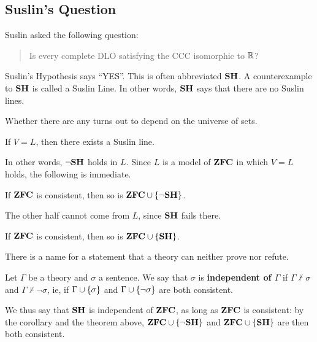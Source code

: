 \subsection{Suslin's Question}

Suslin asked the following question:
\begin{quote}
    Is every complete DLO satisfying the CCC isomorphic to $\mathbb{R}$?
\end{quote}
Suslin's Hypothesis says ``YES''. This is often abbreviated $\mathbf{SH}$. A counterexample to $\mathbf{SH}$ is called a Suslin Line. In other words, $\mathbf{SH}$ says that there are no Suslin lines.

Whether there are any turns out to depend on the universe of sets.

\begin{boxtheorem}[Jensen, 1960s]
    If $V = L$, then there exists a Suslin line.
\end{boxtheorem}

In other words, $\neg\mathbf{SH}$ holds in $L$. Since $L$ is a model of $\mathbf{ZFC}$ in which $V = L$ holds, the following is immediate.

\begin{boxcorollary}
    If $\mathbf{ZFC}$ is consistent, then so is $\mathbf{ZFC} \cup \left\{ \neg\mathbf{SH} \right\}$.
\end{boxcorollary}

The other half cannot come from $L$, since $\mathbf{SH}$ fails there.

\begin{boxtheorem}
    If $\mathbf{ZFC}$ is consistent, then so is $\mathbf{ZFC} \cup \left\{ \mathbf{SH} \right\}$.
\end{boxtheorem}

There is a name for a statement that a theory can neither prove nor refute.

\begin{boxdefinition}[Independence]
    Let $\Gamma$ be a theory and $\sigma$ a sentence. We say that $\sigma$ is \textbf{independent of $\Gamma$} if $\Gamma \nvdash \sigma$ and $\Gamma \nvdash \neg\sigma$, ie, if $\Gamma \cup \left\{ \sigma \right\}$ and $\Gamma \cup \left\{ \neg\sigma \right\}$ are both consistent.
\end{boxdefinition}

We thus say that $\mathbf{SH}$ is independent of $\mathbf{ZFC}$, as long as $\mathbf{ZFC}$ is consistent: by the corollary and the theorem above, $\mathbf{ZFC} \cup \left\{ \neg\mathbf{SH} \right\}$ and $\mathbf{ZFC} \cup \left\{ \mathbf{SH} \right\}$ are then both consistent.
